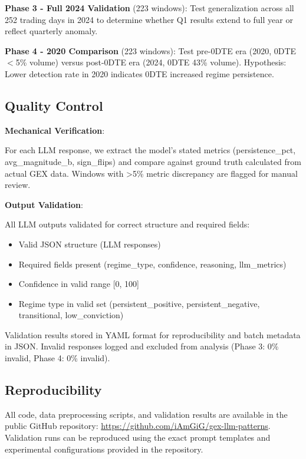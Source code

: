 \vspace{0.2cm}

\noindent\textbf{Phase 3 - Full 2024 Validation} (223 windows): Test generalization across all 252 trading days in 2024 to determine whether Q1 results extend to full year or reflect quarterly anomaly.

\vspace{0.2cm}

\noindent\textbf{Phase 4 - 2020 Comparison} (223 windows): Test pre-0DTE era (2020, 0DTE $<$5\% volume) versus post-0DTE era (2024, 0DTE 43\% volume). Hypothesis: Lower detection rate in 2020 indicates 0DTE increased regime persistence.

\subsection{Quality Control}

\vspace{0.2cm}

\noindent\textbf{Mechanical Verification}:

For each LLM response, we extract the model's stated metrics (persistence\_pct, avg\_magnitude\_b, sign\_flips) and compare against ground truth calculated from actual GEX data. Windows with >5\% metric discrepancy are flagged for manual review.

\vspace{0.2cm}

\noindent\textbf{Output Validation}:

All LLM outputs validated for correct structure and required fields:
\begin{itemize}
\item Valid JSON structure (LLM responses)
\item Required fields present (regime\_type, confidence, reasoning, llm\_metrics)
\item Confidence in valid range [0, 100]
\item Regime type in valid set (persistent\_positive, persistent\_negative, transitional, low\_conviction)
\end{itemize}

Validation results stored in YAML format for reproducibility and batch metadata in JSON. Invalid responses logged and excluded from analysis (Phase 3: 0\% invalid, Phase 4: 0\% invalid).

\subsection{Reproducibility}

All code, data preprocessing scripts, and validation results are available in the public GitHub repository: \url{https://github.com/iAmGiG/gex-llm-patterns}. Validation runs can be reproduced using the exact prompt templates and experimental configurations provided in the repository.
